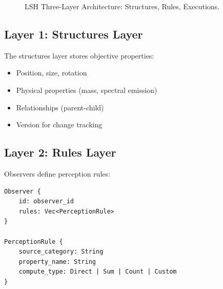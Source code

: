 \documentclass{article}
\begin{document}
\begin{figure}[t]
\centering
{}
\caption{LSH Three-Layer Architecture: Structures, Rules, Executions.}
\label{fig:three-layer}
\end{figure}

\subsection{Layer 1: Structures Layer}

The structures layer stores objective properties:

\begin{itemize}
\item Position, size, rotation
\item Physical properties (mass, spectral emission)
\item Relationships (parent-child)
\item Version for change tracking
\end{itemize}

\subsection{Layer 2: Rules Layer}

Observers define perception rules:

\begin{verbatim}
Observer {
    id: observer_id
    rules: Vec<PerceptionRule>
}

PerceptionRule {
    source_category: String
    property_name: String
    compute_type: Direct | Sum | Count | Custom
}
\end{verbatim}
\end{document}
